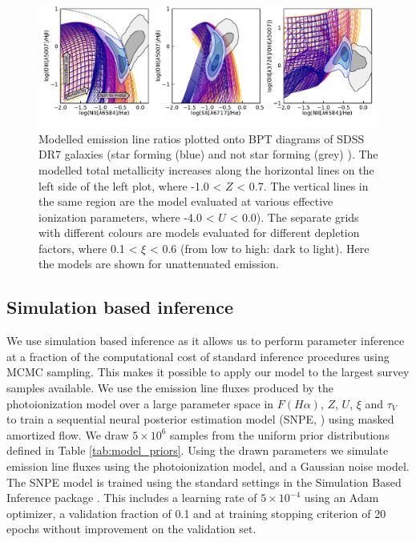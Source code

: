 \documentclass[fleqn,usenatbib]{mnras}
\begin{document}
\begin{figure}
    \centering
    \includegraphics[width=\textwidth]{figures/fig1.pdf}
    \caption{Modelled emission line ratios plotted onto BPT diagrams of SDSS DR7 galaxies (star forming (blue) and not star forming (grey) \citep{kauffmann2003}). The modelled total metallicity increases along the horizontal lines on the left side of the left plot, where -1.0 < $Z$ < 0.7. The vertical lines in the same region are the model evaluated at various effective ionization parameters, where -4.0 < $U$ < 0.0). The separate grids with different colours are models evaluated for different depletion factors, where 0.1 < $\xi$ < 0.6 (from low to high: dark to light). Here the models are shown for unattenuated emission.}
    \label{fig:photoionization_model_BPT}
\end{figure}

\subsection{Simulation based inference}
We use simulation based inference as it allows us to perform parameter inference at a fraction of the computational cost of standard inference procedures using MCMC sampling. This makes it possible to apply our model to the largest survey samples available. We use the emission line fluxes produced by the photoionization model over a large parameter space in $F(H\alpha)$, $Z$, $U$, $\xi$ and $\tau_V$ to train a sequential neural posterior estimation model (SNPE, \cite{greenberg2019}) using masked amortized flow.  We draw $5\times10^6$ samples from the uniform prior distributions defined in Table \ref{tab:model_priors}. Using the drawn parameters we simulate emission line fluxes using the photoionization model, and a Gaussian noise model. The SNPE model is trained using the standard settings in the Simulation Based Inference package \citep{tejero-cantero2020}. This includes a learning rate of $5 \times 10^{-4}$ using an Adam optimizer, a validation fraction of 0.1 and at training stopping criterion of 20 epochs without improvement on the validation set. 
\end{document}
